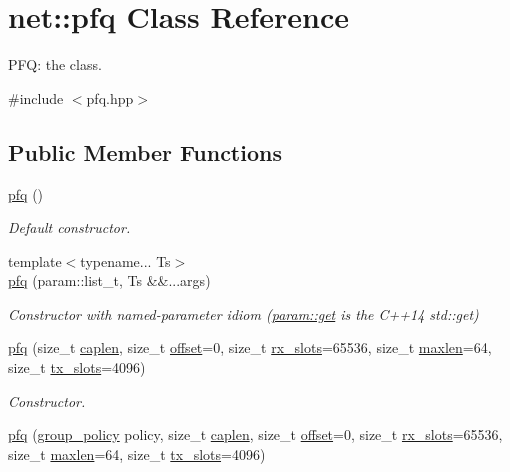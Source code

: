 \hypertarget{classnet_1_1pfq}{\section{net\-:\-:pfq Class Reference}
\label{classnet_1_1pfq}
}


P\-F\-Q\-: the class.  




{\ttfamily \#include $<$pfq.\-hpp$>$}

\subsection*{Public Member Functions}
\begin{DoxyCompactItemize}
\item 
\hyperlink{classnet_1_1pfq_a43214f93ed81a6344c83f991cb1311a7}{pfq} ()
\begin{DoxyCompactList}\small\item\em Default constructor. \end{DoxyCompactList}\item 
{\footnotesize template$<$typename... Ts$>$ }\\\hyperlink{classnet_1_1pfq_a886761849ccf9b22d3eac521c67a89ab}{pfq} (param\-::list\-\_\-t, Ts \&\&...args)
\begin{DoxyCompactList}\small\item\em Constructor with named-\/parameter idiom (\hyperlink{namespacenet_1_1param_a9020a1d5f00da972acbea3e809d3c602}{param\-::get} is the C++14 std\-::get) \end{DoxyCompactList}\item 
\hyperlink{classnet_1_1pfq_af9794841bcf6982000538da4f9ffb824}{pfq} (size\-\_\-t \hyperlink{classnet_1_1pfq_aa915603b2ad8d1226f9bbea0050945c0}{caplen}, size\-\_\-t \hyperlink{classnet_1_1pfq_a83ed78c8c7bc2de33e75e244bbc0b603}{offset}=0, size\-\_\-t \hyperlink{classnet_1_1pfq_a878c768492c68fc572a994a58913a3db}{rx\-\_\-slots}=65536, size\-\_\-t \hyperlink{classnet_1_1pfq_a0424e39990711493af4f24a0c3e9be4d}{maxlen}=64, size\-\_\-t \hyperlink{classnet_1_1pfq_aae98015b961c6210081fa29a2ea34da2}{tx\-\_\-slots}=4096)
\begin{DoxyCompactList}\small\item\em Constructor. \end{DoxyCompactList}\item 
\hyperlink{classnet_1_1pfq_a845ec21f53fd0fbc396b4b682227caa4}{pfq} (\hyperlink{namespacenet_aedc1a0dde937ddbd0800af02920b1067}{group\-\_\-policy} policy, size\-\_\-t \hyperlink{classnet_1_1pfq_aa915603b2ad8d1226f9bbea0050945c0}{caplen}, size\-\_\-t \hyperlink{classnet_1_1pfq_a83ed78c8c7bc2de33e75e244bbc0b603}{offset}=0, size\-\_\-t \hyperlink{classnet_1_1pfq_a878c768492c68fc572a994a58913a3db}{rx\-\_\-slots}=65536, size\-\_\-t \hyperlink{classnet_1_1pfq_a0424e39990711493af4f24a0c3e9be4d}{maxlen}=64, size\-\_\-t \hyperlink{classnet_1_1pfq_aae98015b961c6210081fa29a2ea34da2}{tx\-\_\-slots}=4096)

\end{DoxyCompactItemize}
